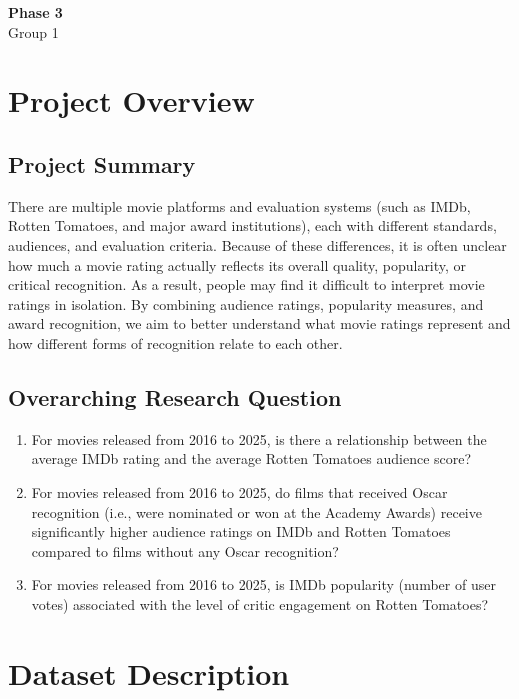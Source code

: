 \documentclass[12pt]{article}
\begin{document}
\begin{center}
    {\LARGE \textbf{Phase 3}}\\[0.5em]
    {\large Group 1}
\end{center}

\vspace{1em}

\section{Project Overview}

\subsection{Project Summary}
There are multiple movie platforms and evaluation systems (such as IMDb, Rotten Tomatoes, and major award institutions), each with different standards, audiences, and evaluation criteria. Because of these differences, it is often unclear how much a movie rating actually reflects its overall quality, popularity, or critical recognition. As a result, people may find it difficult to interpret movie ratings in isolation. By combining audience ratings, popularity measures, and award recognition, we aim to better understand what movie ratings represent and how different forms of recognition relate to each other.

\subsection{Overarching Research Question}
\begin{enumerate}[leftmargin=1.5em]
    \item For movies released from 2016 to 2025, is there a relationship between the average IMDb rating and the average Rotten Tomatoes audience score?
    \item For movies released from 2016 to 2025, do films that received Oscar recognition (i.e., were nominated or won at the Academy Awards) receive significantly higher audience ratings on IMDb and Rotten Tomatoes compared to films without any Oscar recognition?
    \item For movies released from 2016 to 2025, is IMDb popularity (number of user votes) associated with the level of critic engagement on Rotten Tomatoes?
\end{enumerate}

\section{Dataset Description}
\end{document}
